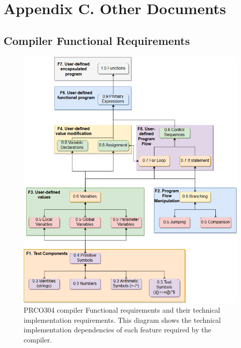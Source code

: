 \documentclass[11pt,a4paper]{report}
\newcommand{\scname}{PRCO304}
\begin{document}
\newpage
\section{Appendix C. Other Documents}
\subsection{Compiler Functional Requirements}
\label{sect:compiler_func_req}

\begin{figure}[H]
\begin{center}
\includegraphics[scale=0.5]{compiler_dependencies}
\end{center}
\caption{\scname{} compiler Functional requirements and their technical implementation requirements. This diagram shows the technical implementation dependencies of each feature required by the compiler.}
\label{fig:compiler_dependencies}
\end{figure}
\end{document}
